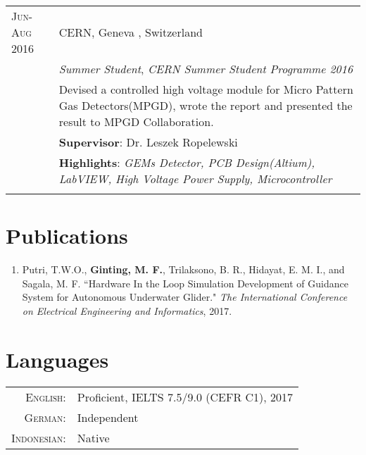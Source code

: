 \documentclass[a4paper,10pt]{article} %
\begin{document}
\begin{tabular}{lp{12cm}}

\textsc{Jun-Aug 2016} & \textsc{CERN}, Geneva , Switzerland \\
& \emph{Summer Student}, \textit{CERN Summer Student Programme 2016}\\ 
& \footnotesize{Devised a controlled high voltage module for Micro Pattern Gas Detectors(MPGD), wrote the report and presented the result to MPGD Collaboration.}\\
& \footnotesize{\textbf{Supervisor}: Dr. Leszek Ropelewski}\\
& \footnotesize{\textbf{Highlights}: \textit{GEMs Detector, PCB Design(Altium),  LabVIEW, High Voltage Power Supply, Microcontroller}}\\
\multicolumn{2}{c}{} \\
\end{tabular}

\vspace{-4mm}
\section{Publications}
\begin{enumerate}
  \item Putri, T.W.O., {\bf Ginting, M. F.}, Trilaksono, B. R., Hidayat, E. M. I., and Sagala, M. F.  ``Hardware In the Loop Simulation Development of Guidance System for Autonomous Underwater Glider." 
\emph{The International Conference on Electrical Engineering and Informatics}, 2017.
\end{enumerate}


\vspace{-4mm}
\section{Languages}

\begin{tabular}{rl}
\textsc{English:} & Proficient, IELTS 7.5/9.0 (CEFR C1), 2017\\

\textsc{German:} & Independent\\
\textsc{Indonesian:} & Native\\

\end{tabular}
\end{document}
